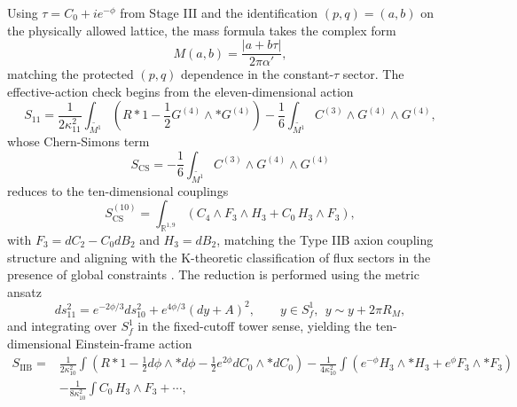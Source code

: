 \documentclass[11pt]{article}
\theoremstyle{remark}
\newcommand{\R}{\mathbb{R}}
\newcommand{\tM}{\widetilde{M^{1}}}
\begin{document}
Using \(\tau=C_{0}+ie^{-\phi}\) from Stage III and the identification \((p,q)=(a,b)\) on the physically allowed lattice, the mass formula takes the complex form
\begin{equation}\label{116}
M(a,b)=\frac{|a+b\tau|}{2\pi\alpha'},
\end{equation}
matching the protected \((p,q)\) dependence in the constant-\(\tau\) sector. The effective-action check begins from the eleven-dimensional action
\begin{equation}\label{117}
S_{11}=\frac1{2\kappa_{11}^{2}}\int_{\tM}\left(R*1-\frac12 G^{(4)}\wedge *G^{(4)}\right)-\frac16\int_{\tM}C^{(3)}\wedge G^{(4)}\wedge G^{(4)},
\end{equation}
whose Chern-Simons term
\begin{equation}\label{118}
S_{\mathrm{CS}}=-\frac16\int_{\tM}C^{(3)}\wedge G^{(4)}\wedge G^{(4)}
\end{equation}
reduces to the ten-dimensional couplings
\begin{equation}\label{119}
S_{\mathrm{CS}}^{(10)}=\int_{\R^{1,9}}\left(C_{4}\wedge F_{3}\wedge H_{3}+C_{0}\,H_{3}\wedge F_{3}\right),
\end{equation}
with \(F_{3}=dC_{2}-C_{0}dB_{2}\) and \(H_{3}=dB_{2}\), matching the Type IIB axion coupling structure \cite{Schwarz1995, Schwarz1983} and aligning with the K-theoretic classification of flux sectors in the presence of global constraints \cite{FreedHopkinsTeleman2008}. The reduction is performed using the metric ansatz
\begin{equation}\label{120}
ds^{2}_{11}=e^{-2\phi/3}ds^{2}_{10}+e^{4\phi/3}(dy+A)^{2},\qquad y\in S_f^{1},\ \ y\sim y+2\pi R_M,
\end{equation}
and integrating over \(S_f^{1}\) in the fixed-cutoff tower sense, yielding the ten-dimensional Einstein-frame action
\begin{equation}\label{121}
\begin{aligned}
S_{\mathrm{IIB}}=&\frac1{2\kappa_{10}^{2}}\int\left(R*1-\frac12 d\phi\wedge *d\phi-\frac12 e^{2\phi}dC_{0}\wedge *dC_{0}\right)-\frac1{4\kappa_{10}^{2}}\int\left(e^{-\phi}H_{3}\wedge *H_{3}+e^{\phi}F_{3}\wedge *F_{3}\right)\\
&-\frac1{8\kappa_{10}^{2}}\int C_{0}\,H_{3}\wedge F_{3}+\cdots,
\end{aligned}
\end{equation}
\end{document}
